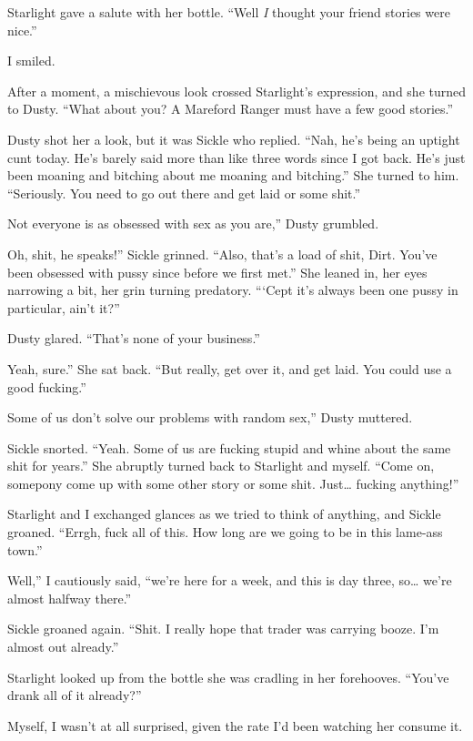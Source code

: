 Starlight gave a salute with her bottle. “Well \textit{I} thought your friend stories were nice.”

I smiled.

After a moment, a mischievous look crossed Starlight’s expression, and she turned to Dusty. “What about you? A Mareford Ranger must have a few good stories.”

Dusty shot her a look, but it was Sickle who replied. “Nah, he’s being an uptight cunt today. He’s barely said more than like three words since I got back. He’s just been moaning and bitching about me moaning and bitching.” She turned to him. “Seriously. You need to go out there and get laid or some shit.”

\leavevmode{}Not everyone is as obsessed with sex as you are,” Dusty grumbled.

\leavevmode{}Oh, shit, he speaks!” Sickle grinned. “Also, that’s a load of shit, Dirt. You’ve been obsessed with pussy since before we first met.” She leaned in, her eyes narrowing a bit, her grin turning predatory. “‘Cept it’s always been one pussy in particular, ain’t it?”

Dusty glared. “That’s none of your business.”

\leavevmode{}Yeah, sure.” She sat back. “But really, get over it, and get laid. You could use a good fucking.”

\leavevmode{}Some of us don’t solve our problems with random sex,” Dusty muttered.

Sickle snorted. “Yeah. Some of us are fucking stupid and whine about the same shit for years.” She abruptly turned back to Starlight and myself. “Come on, somepony come up with some other story or some shit. Just… fucking anything!”

Starlight and I exchanged glances as we tried to think of anything, and Sickle groaned. “Errgh, fuck all of this. How long are we going to be in this lame-ass town.”

\leavevmode{}Well,” I cautiously said, “we’re here for a week, and this is day three, so… we’re almost halfway there.”

Sickle groaned again. “Shit. I really hope that trader was carrying booze. I’m almost out already.”

Starlight looked up from the bottle she was cradling in her forehooves. “You’ve drank all of it already?”

Myself, I wasn’t at all surprised, given the rate I’d been watching her consume it.

